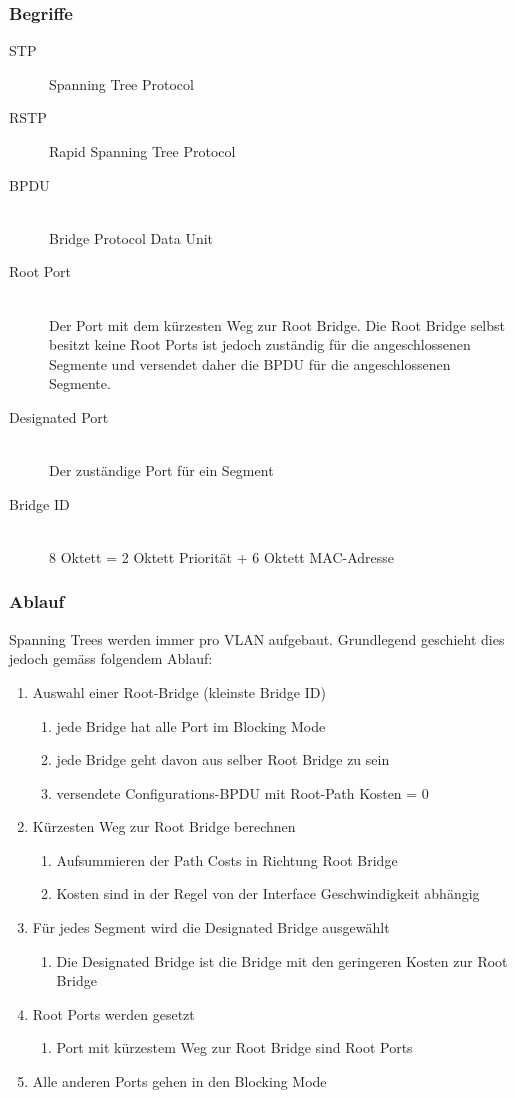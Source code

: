\subsubsection{Begriffe}
\begin{description}
	\item[STP] Spanning Tree Protocol
	\item[RSTP] Rapid Spanning Tree Protocol
	\item[BPDU] \hfill \\
		Bridge Protocol Data Unit
	\item[Root Port] \hfill \\
		Der Port mit dem kürzesten Weg zur Root Bridge. Die Root Bridge selbst besitzt keine Root Ports ist jedoch zuständig für die angeschlossenen Segmente und versendet daher die BPDU für die angeschlossenen Segmente.
	\item[Designated Port] \hfill \\
		Der zuständige Port für ein Segment
	\item[Bridge ID] \hfill \\
		8 Oktett = 2 Oktett Priorität + 6 Oktett MAC-Adresse
\end{description}

\subsubsection{Ablauf}
Spanning Trees werden immer pro VLAN aufgebaut. Grundlegend geschieht dies jedoch gemäss folgendem Ablauf:
\begin{enumerate}
	\item Auswahl einer Root-Bridge (kleinste Bridge ID)
		\begin{enumerate}
			\item jede Bridge hat alle Port im Blocking Mode
			\item jede Bridge geht davon aus selber Root Bridge zu sein
			\item versendete Configurations-BPDU mit Root-Path Kosten = 0
		\end{enumerate}
	\item Kürzesten Weg zur Root Bridge berechnen
		\begin{enumerate}
			\item Aufsummieren der Path Costs in Richtung Root Bridge
			\item Kosten sind in der Regel von der Interface Geschwindigkeit abhängig
		\end{enumerate}
	\item Für jedes Segment wird die Designated Bridge ausgewählt
		\begin{enumerate}
			\item Die Designated Bridge ist die Bridge mit den geringeren Kosten zur Root Bridge
		\end{enumerate}
	\item Root Ports werden gesetzt
		\begin{enumerate}
			\item Port mit kürzestem Weg zur Root Bridge sind Root Ports
		\end{enumerate}
	\item Alle anderen Ports gehen in den Blocking Mode
\end{enumerate}

